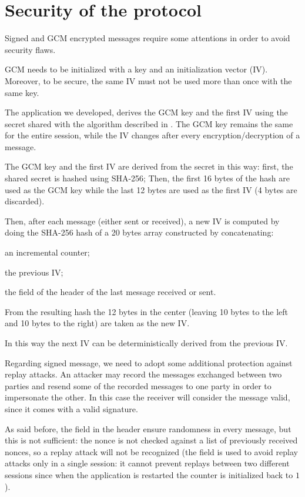 \section{Security of the protocol}\label{sec:protosecurity}

Signed and GCM encrypted messages require some attentions in order to avoid
security flaws.

GCM needs to be initialized with a key and an initialization vector (IV).
Moreover, to be secure, the same IV must not be used more than once with the
same key.

The application we developed, derives the GCM key and the first IV using the
secret shared with the algorithm described in . The GCM key
remains the same for the entire session, while the IV changes after every
encryption/decryption of a message.

The GCM key and the first IV are derived from the secret in this way: first, the
shared secret is hashed using SHA-256; Then, the first 16 bytes of the hash are
used as the GCM key while the last 12 bytes are used as the first IV (4 bytes
are discarded).

Then, after each message (either sent or received), a new IV is computed by
doing the SHA-256 hash of a 20 bytes array constructed by concatenating:
\begin{enumerate*}[label=\textnormal{\arabic*)}]
	\item an incremental counter;
	\item the previous IV\@;
	\item the  field of the header of the last message received
		or sent.
\end{enumerate*}
From the resulting hash the 12 bytes in the center (leaving 10 bytes to the left
and 10 bytes to the right) are taken as the new IV\@.

In this way the next IV can be deterministically derived from the previous IV\@.

Regarding signed message, we need to adopt some additional protection against
replay attacks. An attacker may record the messages exchanged between two
parties  and resend some of the recorded
messages to one party in order to impersonate the other. In this case the
receiver will consider the message valid, since it comes with a valid signature.

As said before, the  field in the header ensure randomness in every
message, but this is not sufficient: the nonce is not checked against a list of
previously received nonces, so a replay attack will not be recognized (the
 field is used to avoid replay attacks only in a single session:
it cannot prevent replays between two different sessions since when the
application is restarted the counter is initialized back to \(1\)).


